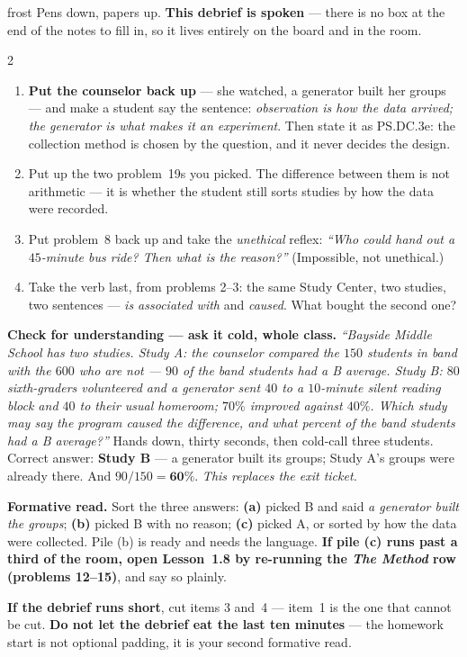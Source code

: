 \documentclass[10pt]{article}
\begin{document}
\boxguard[24]
\begin{skillbox}{frost}
Pens down, papers up. \textbf{This debrief is spoken} --- there is no box at the end of the
notes to fill in, so it lives entirely on the board and in the room.
\begin{multicols}{2}
\begin{enumerate}[leftmargin=1.3em, nosep, itemsep=3pt]
  \item \textbf{Put the counselor back up} --- she watched, a generator built her groups --- and
        make a student say the sentence: \emph{observation is how the data arrived; the
        generator is what makes it an experiment}. Then state it as PS.DC.3e: the collection
        method is chosen by the question, and it never decides the design.
  \item Put up the two problem~19s you picked. The difference between them is not arithmetic ---
        it is whether the student still sorts studies by how the data were recorded.
  \item Put problem~8 back up and take the \emph{unethical} reflex: \emph{``Who could hand out a
        $45$-minute bus ride? Then what is the reason?''} (Impossible, not unethical.)
  \item Take the verb last, from problems 2--3: the same Study Center, two studies, two
        sentences --- \emph{is associated with} and \emph{caused}. What bought the second one?
\end{enumerate}
\columnbreak
\textbf{Check for understanding --- ask it cold, whole class.} \emph{``Bayside Middle School has
two studies. Study A: the counselor compared the $150$ students in band with the $600$ who are
not --- $90$ of the band students had a B average. Study B: $80$ sixth-graders volunteered and a
generator sent $40$ to a $10$-minute silent reading block and $40$ to their usual homeroom;
$70\%$ improved against $40\%$. Which study may say the program \emph{caused} the difference,
and what percent of the band students had a B average?''} Hands down, thirty seconds, then
cold-call three students. Correct answer: \textbf{Study B} --- a generator built its groups;
Study A's groups were already there. And $90/150 = \textbf{60\%}$. \emph{This replaces the exit
ticket.}

\textbf{Formative read.} Sort the three answers: \textbf{(a)} picked B and said \emph{a
generator built the groups}; \textbf{(b)} picked B with no reason; \textbf{(c)} picked A, or
sorted by how the data were collected. Pile (b) is ready and needs the language. \textbf{If pile
(c) runs past a third of the room, open Lesson~1.8 by re-running the \emph{The Method} row
(problems 12--15)}, and say so plainly.

\textbf{If the debrief runs short}, cut items 3 and~4 --- item~1 is the one that cannot be cut.
\textbf{Do not let the debrief eat the last ten minutes} --- the homework start is not optional
padding, it is your second formative read.
\end{multicols}
\end{skillbox}
\end{document}
